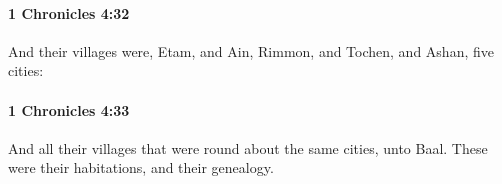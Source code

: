 		\paragraph{1 Chronicles 4:32} %
			\label{1CHRONICLES-4-32}

			And their villages were, Etam, and Ain, Rimmon, and Tochen, and Ashan, five cities:


		\paragraph{1 Chronicles 4:33} %
			\label{1CHRONICLES-4-33}

			And all their villages that were round about the same cities, unto Baal. These were their habitations, and their genealogy.


